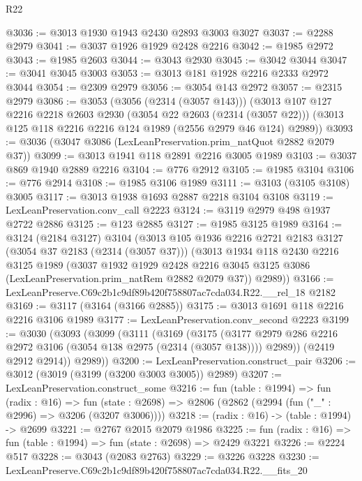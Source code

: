 \begin{lexlean}{R22}
\begin{coremodule}
@3036 := @3013 @1930 @1943 @2430 @2893 @3003 @3027
@3037 := @2288 @2979
@3041 := @3037 @1926 @1929 @2428 @2216
@3042 := @1985 @2972
@3043 := @1985 @2603
@3044 := @3043 @2930
@3045 := @3042 @3044
@3047 := @3041 @3045 @3003
@3053 := @3013 @181 @1928 @2216 @2333 @2972 @3044
@3054 := @2309 @2979
@3056 := @3054 @143 @2972
@3057 := @2315 @2979
@3086 := @3053
    (@3056 (@2314 (@3057 @143)))
    (@3013
      @107
      @127
      @2216
      @2218
      @2603
      @2930
      (@3054 @22 @2603 (@2314 (@3057 @22)))
      (@3013 @125 @118 @2216 @2216 @124 @1989 (@2556 @2979 @46 @124) @2989))
@3093 := @3036 (@3047 @3086 (LexLeanPreservation.prim_natQuot @2882 @2079 @37))
@3099 := @3013 @1941 @118 @2891 @2216 @3005 @1989
@3103 := @3037 @869 @1940 @2889 @2216
@3104 := @776 @2912
@3105 := @1985 @3104
@3106 := @776 @2914
@3108 := @1985 @3106 @1989
@3111 := @3103 (@3105 @3108) @3005
@3117 := @3013 @1938 @1693 @2887 @2218 @3104 @3108
@3119 := LexLeanPreservation.conv_call @2223
@3124 := @3119 @2979 @498 @1937 @2722 @2886
@3125 := @123 @2885
@3127 := @1985 @3125 @1989
@3164 := @3124
    (@2184 @3127)
    @3104
    (@3013
      @105
      @1936
      @2216
      @2721
      @2183
      @3127
      (@3054 @37 @2183 (@2314 (@3057 @37)))
      (@3013
        @1934
        @118
        @2430
        @2216
        @3125
        @1989
        (@3037
          @1932
          @1929
          @2428
          @2216
          @3045
          @3125
          @3086
          (LexLeanPreservation.prim_natRem @2882 @2079 @37))
        @2989))
@3166 := LexLeanPreserve.C69c2b1c9df89b420f758807ac7cda034.R22.__rel_18 @2182
@3169 := @3117 (@3164 (@3166 @2885))
@3175 := @3013 @1691 @118 @2216 @2216 @3106 @1989
@3177 := LexLeanPreservation.conv_second @2223
@3199 := @3030
    (@3093
      (@3099
        (@3111
          (@3169
            (@3175
              (@3177 @2979 @286 @2216 @2972 @3106 (@3054 @138 @2975 (@2314 (@3057 @138))))
              @2989))
          (@2419 @2912 @2914))
        @2989))
@3200 := LexLeanPreservation.construct_pair
@3206 := @3012 (@3019 (@3199 (@3200 @3003 @3005)) @2989)
@3207 := LexLeanPreservation.construct_some
@3216 := fun (table : @1994) =>
  fun (radix : @16) =>
  fun (state : @2698) => @2806 (@2862 (@2994 (fun ("_" : @2996) => @3206 (@3207 @3006))))
@3218 := (radix : @16) -> (table : @1994) -> @2699
@3221 := @2767 @2015 @2079 @1986
@3225 := fun (radix : @16) => fun (table : @1994) => fun (state : @2698) => @2429 @3221
@3226 := @2224 @517
@3228 := @3043 (@2083 @2763)
@3229 := @3226 @3228
@3230 := LexLeanPreserve.C69c2b1c9df89b420f758807ac7cda034.R22.__fits_20

\end{coremodule}
\end{lexlean}
